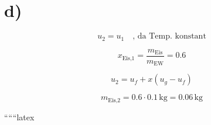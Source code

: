 

\section*{d)}

\[
u_2 = u_1 \quad \text{, da Temp. konstant}
\]

\[
x_{\text{Eis,1}} = \frac{m_{\text{Eis}}}{m_{\text{EW}}} = 0.6
\]

\[
u_2 = u_f + x (u_g - u_f)
\]

\[
m_{\text{Eis,2}} = 0.6 \cdot 0.1 \, \text{kg} = 0.06 \, \text{kg}
\]

``````latex